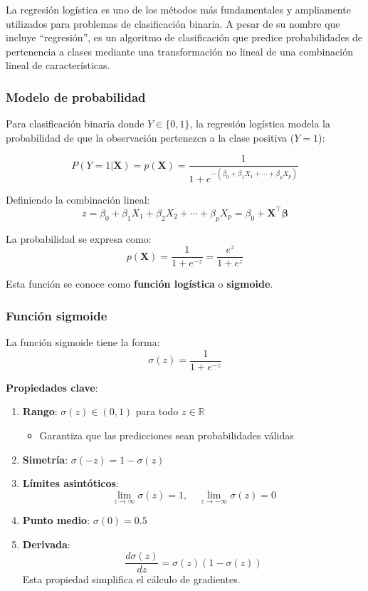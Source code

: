\documentclass[
  doc,
  floatsintext,
  longtable,
  a4paper,
  nolmodern,
  notxfonts,
  notimes,
  12pt,
  colorlinks=true,linkcolor=blue,citecolor=blue,urlcolor=blue]{apa7}
\providecommand{\tightlist}{%
  \setlength{\itemsep}{0pt}\setlength{\parskip}{0pt}}
\begin{document}
La regresión logística es uno de los métodos más fundamentales y
ampliamente utilizados para problemas de clasificación binaria. A pesar
de su nombre que incluye ``regresión'', es un algoritmo de clasificación
que predice probabilidades de pertenencia a clases mediante una
transformación no lineal de una combinación lineal de características.

\subsubsection{Modelo de probabilidad}\label{modelo-de-probabilidad}

Para clasificación binaria donde \(Y \in \{0, 1\}\), la regresión
logística modela la probabilidad de que la observación pertenezca a la
clase positiva (\(Y=1\)):

\[
P(Y=1 | \mathbf{X}) = p(\mathbf{X}) = \frac{1}{1 + e^{-(\beta_0 + \beta_1 X_1 + \cdots + \beta_p X_p)}}
\]

Definiendo la combinación lineal: \[
z = \beta_0 + \beta_1 X_1 + \beta_2 X_2 + \cdots + \beta_p X_p = \beta_0 + \mathbf{X}^\top\boldsymbol{\beta}
\]

La probabilidad se expresa como: \[
p(\mathbf{X}) = \frac{1}{1 + e^{-z}} = \frac{e^z}{1 + e^z}
\]

Esta función se conoce como \textbf{función logística} o
\textbf{sigmoide}.

\subsubsection{Función sigmoide}\label{funciuxf3n-sigmoide}

La función sigmoide tiene la forma: \[
\sigma(z) = \frac{1}{1 + e^{-z}}
\]

\textbf{Propiedades clave}:

\begin{enumerate}
\def\labelenumi{\arabic{enumi}.}
\item
  \textbf{Rango}: \(\sigma(z) \in (0, 1)\) para todo
  \(z \in \mathbb{R}\)

  \begin{itemize}
  \tightlist
  \item
    Garantiza que las predicciones sean probabilidades válidas
  \end{itemize}
\item
  \textbf{Simetría}: \(\sigma(-z) = 1 - \sigma(z)\)
\item
  \textbf{Límites asintóticos}: \[
  \lim_{z \to \infty} \sigma(z) = 1, \quad \lim_{z \to -\infty} \sigma(z) = 0
  \]
\item
  \textbf{Punto medio}: \(\sigma(0) = 0.5\)
\item
  \textbf{Derivada}: \[
  \frac{d\sigma(z)}{dz} = \sigma(z)(1 - \sigma(z))
  \] Esta propiedad simplifica el cálculo de gradientes.
\end{enumerate}
\end{document}
